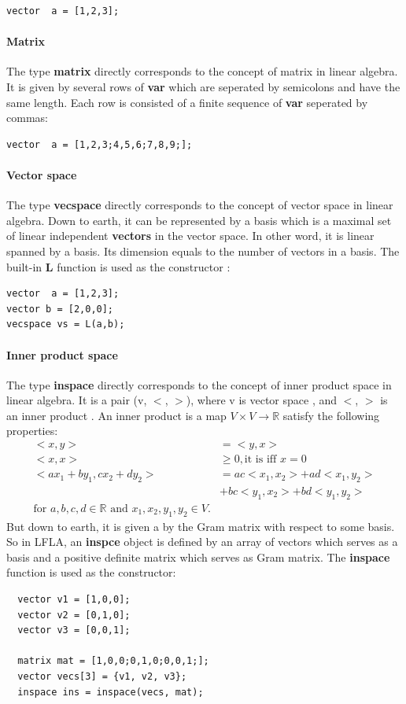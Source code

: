 \documentclass[12pt]{article} %
\begin{document}
\begin{lstlisting}
vector  a = [1,2,3];
\end{lstlisting}
 
\paragraph{Matrix} 
The type \textbf{matrix}  directly corresponds to the concept of  matrix in linear algebra. It is given by  several rows of  \textbf{var} which are seperated by  semicolons and have the same length. Each row is consisted of a finite sequence of  \textbf{var} seperated by commas:
 
\begin{lstlisting}
vector  a = [1,2,3;4,5,6;7,8,9;];
\end{lstlisting}

\paragraph{Vector space}
The type \textbf{vecspace}  directly corresponds to the concept of vector space in linear algebra. Down to earth, it can be represented by  a basis which is a maximal set of linear independent \textbf{vectors} in the vector space. In other word, it is linear spanned by a basis. Its dimension equals to the number of vectors in a basis. The built-in \textbf{L} function is used as the constructor :
\begin{lstlisting}
vector  a = [1,2,3];
vector b = [2,0,0];
vecspace vs = L(a,b);
\end{lstlisting}
\paragraph{Inner product space}
The type \textbf{inspace} directly corresponds to the concept of inner product space in linear algebra. It is a  pair (v, $<$, $>$), where v is vector space , and $<$, $>$ is an inner product .
An inner product is a map $V\times V \to \mathbb{R}$ satisfy the following properties:
\begin{align*}
	<x, y> &= <y,x> \\
	<x,x> &\geq 0, \text{it is  iff } x = 0 \\
	<ax_1 + by_1, cx_2 + dy_2> &= ac<x_1,x_2> + ad<x_1,y_2> \\
         & + bc<y_1,x_2> +bd<y_1,y_2> \\
	\text{for } a,b,c,d \in \mathbb{R} \text{ and } x_1,x_2,y_1,y_2 \in V.
\end{align*}
But down to earth, it is given a by the Gram matrix with respect to some basis.  So in LFLA, an \textbf{inspce} object is defined by an array of vectors which serves as  a basis  and a positive definite matrix which serves as Gram matrix. The \textbf{inspace} function is used as the constructor:
 \begin{lstlisting}
  vector v1 = [1,0,0];
  vector v2 = [0,1,0];
  vector v3 = [0,0,1];
   
  matrix mat = [1,0,0;0,1,0;0,0,1;];
  vector vecs[3] = {v1, v2, v3};
  inspace ins = inspace(vecs, mat); 
\end{lstlisting}
\end{document}
